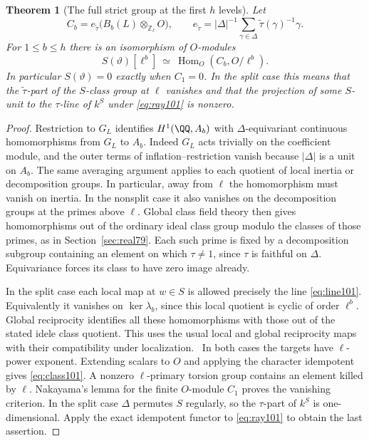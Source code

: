 \documentclass[a4paper,11pt]{article}
\newtheorem{theorem}[proposition]{Theorem}
\theoremstyle{definition}
\theoremstyle{remark}
\newcommand{\ZZ}{\mathbb Z}\newcommand{\ord}{\operatorname{ord}}
\numberwithin{equation}{section}
\begin{document}
\begin{theorem}[The full strict group at the first \(h\) levels]
\label{thm:ray101}
Let
\[
 C_b=e_{\widetilde\tau}\bigl(B_b(L)\otimes_{\ZZ_\ell}O\bigr),
 \qquad e_{\widetilde\tau}
 =|\Delta|^{-1}\sum_{\gamma\in\Delta}
                   \widetilde\tau(\gamma)^{-1}\gamma .
\]
For \(1\le b\le h\) there is an isomorphism of \(O\)-modules
\begin{equation}
 S(\vartheta)[\ell^b]\ \simeq\ \operatorname{Hom}_O(C_b,O/\ell^b).
                                                               \label{eq:class101}
\end{equation}
In particular \(S(\vartheta)=0\) exactly when \(C_1=0\).
In the split case this means that the \(\widetilde\tau\)-part
of the \(S\)-class group at \(\ell\) vanishes and that the
projection of some \(S\)-unit to the \(\tau\)-line of \(k^S\)
under \eqref{eq:ray101} is nonzero.
\end{theorem}
\begin{proof}
Restriction to \(G_L\) identifies \(H^1(\QQ,A_b)\) with
\(\Delta\)-equivariant continuous homomorphisms from \(G_L\)
to \(A_b\). Indeed \(G_L\) acts trivially on the
coefficient module, and the outer terms of inflation--restriction
vanish because \(|\Delta|\) is a unit on \(A_b\). The same
averaging argument applies to each quotient of local inertia or
decomposition groups. In particular, away from \(\ell\) the
homomorphism must vanish on inertia. In the nonsplit case it
also vanishes on the decomposition groups at the primes above
\(\ell\). Global class field theory then gives homomorphisms out
of the ordinary ideal class group modulo the classes of those
primes, as in Section~\ref{sec:real79}. Each such prime is fixed
by a decomposition subgroup containing an element on which
\(\tau\ne1\), since \(\tau\) is faithful on \(\Delta\).
Equivariance forces its class to have zero image already.

In the split case each local map at \(w\in S\) is allowed precisely
the line \eqref{eq:line101}. Equivalently it vanishes on
\(\ker\lambda_b\), since this local quotient is cyclic of order
\(\ell^b\). Global reciprocity identifies all these homomorphisms
with those out of the stated idele class quotient. This uses the
usual local and global reciprocity maps with their compatibility
under localization.~\cite{V-III-V-cft101}
In both cases the targets have \(\ell\)-power exponent. Extending
scalars to \(O\) and applying the character idempotent gives
\eqref{eq:class101}. A nonzero \(\ell\)-primary torsion group
contains an element killed by \(\ell\). Nakayama's lemma for the
finite \(O\)-module \(C_1\) proves the vanishing criterion.
In the split case \(\Delta\) permutes \(S\) regularly, so the
\(\tau\)-part of \(k^S\) is one-dimensional. Apply the exact
idempotent functor to \eqref{eq:ray101} to obtain the last
assertion.
\end{proof}
\end{document}
